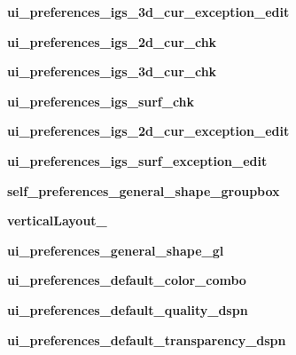 \begin{DoxyCompactItemize}
{\bfseries ui\+\_\+preferences\+\_\+igs\+\_\+3d\+\_\+cur\+\_\+exception\+\_\+edit}
\item 
\hypertarget{a00107_a1ce10779ded45f28b6afd571de7c1dc4}{}\label{a00107_a1ce10779ded45f28b6afd571de7c1dc4} 
{\bfseries ui\+\_\+preferences\+\_\+igs\+\_\+2d\+\_\+cur\+\_\+chk}
\item 
\hypertarget{a00107_af72b1a9124fb421c1fbe62adb174fe77}{}\label{a00107_af72b1a9124fb421c1fbe62adb174fe77} 
{\bfseries ui\+\_\+preferences\+\_\+igs\+\_\+3d\+\_\+cur\+\_\+chk}
\item 
\hypertarget{a00107_a6ff22661fcefd7225763bd7655ceb36c}{}\label{a00107_a6ff22661fcefd7225763bd7655ceb36c} 
{\bfseries ui\+\_\+preferences\+\_\+igs\+\_\+surf\+\_\+chk}
\item 
\hypertarget{a00107_a4e600e40407001e5ea272f73f359cde8}{}\label{a00107_a4e600e40407001e5ea272f73f359cde8} 
{\bfseries ui\+\_\+preferences\+\_\+igs\+\_\+2d\+\_\+cur\+\_\+exception\+\_\+edit}
\item 
\hypertarget{a00107_a420fe65d048f3d9f4c464f5426f72928}{}\label{a00107_a420fe65d048f3d9f4c464f5426f72928} 
{\bfseries ui\+\_\+preferences\+\_\+igs\+\_\+surf\+\_\+exception\+\_\+edit}
\item 
\hypertarget{a00107_a58f750a42bbb7ed7e89fe15f5883bf3d}{}\label{a00107_a58f750a42bbb7ed7e89fe15f5883bf3d} 
{\bfseries self\+\_\+preferences\+\_\+general\+\_\+shape\+\_\+groupbox}
\item 
\hypertarget{a00107_a6cf68c068ac0041c158fb99804e4f6b2}{}\label{a00107_a6cf68c068ac0041c158fb99804e4f6b2} 
{\bfseries vertical\+Layout\+\_}
\item 
\hypertarget{a00107_a44174aad3cbdfd15fed7998607c98f74}{}\label{a00107_a44174aad3cbdfd15fed7998607c98f74} 
{\bfseries ui\+\_\+preferences\+\_\+general\+\_\+shape\+\_\+gl}
\item 
\hypertarget{a00107_a0b043ee35d1213137f70620301f00d5f}{}\label{a00107_a0b043ee35d1213137f70620301f00d5f} 
{\bfseries ui\+\_\+preferences\+\_\+default\+\_\+color\+\_\+combo}
\item 
\hypertarget{a00107_a018f3104e4bb1e4f93acdb919f43d4a7}{}\label{a00107_a018f3104e4bb1e4f93acdb919f43d4a7} 
{\bfseries ui\+\_\+preferences\+\_\+default\+\_\+quality\+\_\+dspn}
\item 
\hypertarget{a00107_a87156afaeff8f61b423a3b7cafc07619}{}\label{a00107_a87156afaeff8f61b423a3b7cafc07619} 
{\bfseries ui\+\_\+preferences\+\_\+default\+\_\+transparency\+\_\+dspn}
\item 
\hypertarget{a00107_af4af1d948631ab4e16506f3dc6ad476d}{}\label{a00107_af4af1d948631ab4e16506f3dc6ad476d} 

\end{DoxyCompactItemize}
